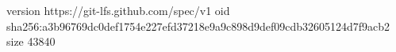 version https://git-lfs.github.com/spec/v1
oid sha256:a3b96769dc0def1754e227efd37218e9a9c898d9def09cdb32605124d7f9acb2
size 43840
